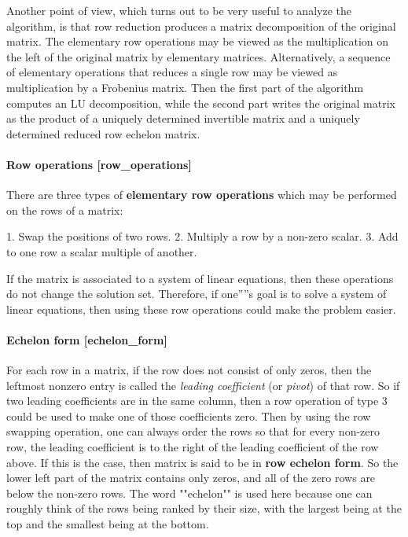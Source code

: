Another point of view, which turns out to be very useful to analyze the
algorithm, is that row reduction produces a matrix decomposition of the
original matrix. The elementary row operations may be viewed as the
multiplication on the left of the original matrix by elementary
matrices. Alternatively, a sequence of elementary operations that
reduces a single row may be viewed as multiplication by a Frobenius
matrix. Then the first part of the algorithm computes an LU
decomposition, while the second part writes the original matrix as the
product of a uniquely determined invertible matrix and a uniquely
determined reduced row echelon matrix.

\paragraph{Row operations [row\_operations]}

There are three types of \textbf{elementary row operations} which may be
performed on the rows of a matrix:

1.  Swap the positions of two rows.
2.  Multiply a row by a non-zero scalar.
3.  Add to one row a scalar multiple of another.

If the matrix is associated to a system of linear equations, then these
operations do not change the solution set. Therefore, if one''''s goal is
to solve a system of linear equations, then using these row operations
could make the problem easier.

\paragraph{Echelon form [echelon\_form]}

For each row in a matrix, if the row does not consist of only zeros,
then the leftmost nonzero entry is called the \textit{leading coefficient} (or
\textit{pivot}) of that row. So if two leading coefficients are in the same
column, then a row operation of type 3 could be used to make one of
those coefficients zero. Then by using the row swapping operation, one
can always order the rows so that for every non-zero row, the leading
coefficient is to the right of the leading coefficient of the row above.
If this is the case, then matrix is said to be in \textbf{row echelon form}.
So the lower left part of the matrix contains only zeros, and all of the
zero rows are below the non-zero rows. The word ""echelon"" is used here
because one can roughly think of the rows being ranked by their size,
with the largest being at the top and the smallest being at the bottom.

